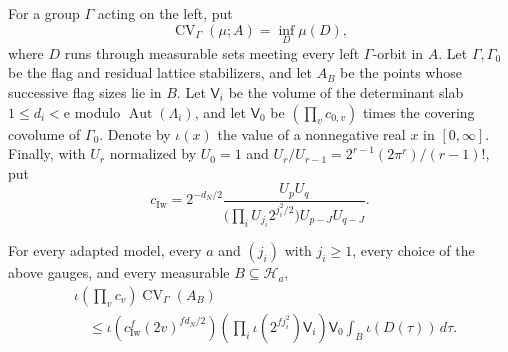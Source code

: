 For a group $\Gamma$ acting on the left, put
\[
 \operatorname{CV}_\Gamma(\mu;A)=
 \inf_D\mu(D),
\]
where $D$ runs through measurable sets meeting every left
$\Gamma$-orbit in $A$. Let $\Gamma,\Gamma_0$ be the flag and residual
lattice stabilizers, and let $A_B$ be the points whose successive flag
sizes lie in $B$. Let $\mathsf V_i$ be the volume of the determinant
slab $1\le d_i<\mathrm e$ modulo $\operatorname{Aut}(\Lambda_i)$, and let
$\mathsf V_0$ be $(\prod_vc_{0,v})$ times the covering covolume of
$\Gamma_0$. Denote by $\iota(x)$ the value of a nonnegative real $x$ in
$[0,\infty]$. Finally, with $U_r$ normalized by
$U_0=1$ and $U_r/U_{r-1}=2^{r-1}(2\pi^r)/(r-1)!$, put
\[
 c_{\mathrm{Iw}}=2^{-d_N/2}\frac{U_pU_q}
 {\bigl(\prod_iU_{j_i}2^{j_i^2/2}\bigr)U_{p-J}U_{q-J}}.
\]

\begin{theorem}
For every adapted model, every $a$ and $(j_i)$ with $j_i\ge1$, every
choice of the above gauges, and every measurable
$B\subseteq\mathcal H_a$,
\begin{equation}\label{eq:adapted-class-bound}
\begin{split}
&\iota\!\left(\prod_vc_v\right)\operatorname{CV}_\Gamma(A_B)\\
&\quad\le \iota\!\left(c_{\mathrm{Iw}}^f(2v)^{fd_N/2}\right)
 \left(\prod_i\iota(2^{fj_i^2})\mathsf V_i\right)\mathsf V_0
 \int_B\iota(D(\tau))\,d\tau .
\end{split}
\end{equation}
\end{theorem}

